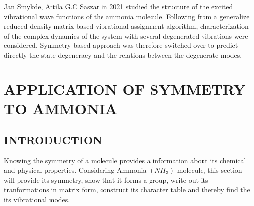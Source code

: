 \documentclass[a4paper, 12pt, openany]{report}
\begin{document}
 	Jan Smykde, Attila G.C Saszar in 2021 studied the structure of the \break excited vibrational wave functions of the ammonia molecule. Following from a generalize reduced-density-matrix based vibrational assignment \break algorithm, characterization of the complex dynamics of the system with \break several degenerated vibrations were considered. Symmetry-based approach was therefore switched over to  predict directly the state degeneracy and the relations between the degenerate modes.


	
	\chapter{APPLICATION OF SYMMETRY TO AMMONIA}
	\section{INTRODUCTION}
	Knowing the symmetry of a molecule provides a information about its \break chemical and physical properties. Considering Ammonia $(NH_3)$ molecule, this section will  provide its symmetry, show that it forms a group, write out its tranformations in matrix form, construct its character table and thereby find the its vibrational modes.
\end{document}
